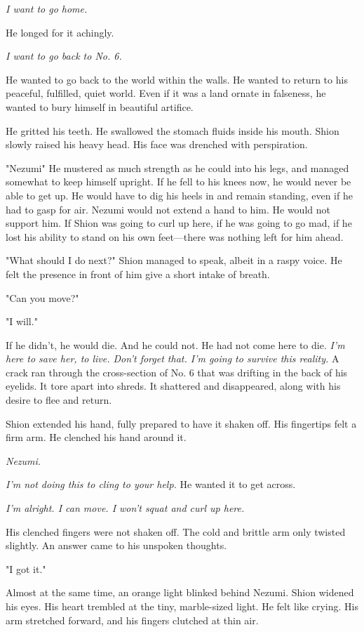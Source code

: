 \emph{I want to go home.}

He longed for it achingly.

\emph{I want to go back to No. 6.}

He wanted to go back to the world within the walls. He wanted to return
to his peaceful, fulfilled, quiet world. Even if it was a land ornate in
falseness, he wanted to bury himself in beautiful artifice.

He gritted his teeth. He swallowed the stomach fluids inside his mouth.
Shion slowly raised his heavy head. His face was drenched with
perspiration.

"Nezumi\el " He mustered as much strength as he could into his legs, and
managed somewhat to keep himself upright. If he fell to his knees now,
he would never be able to get up. He would have to dig his heels in and
remain standing, even if he had to gasp for air. Nezumi would not extend
a hand to him. He would not support him. If Shion was going to curl up
here, if he was going to go mad, if he lost his ability to stand on his
own feet---there was nothing left for him ahead.

"What should I do next?" Shion managed to speak, albeit in a raspy
voice. He felt the presence in front of him give a short intake of
breath.

"Can you move?"

"I will."

If he didn't, he would die. And he could not. He had not come here to
die. \emph{I'm here to save her, to live. Don't forget that. I'm going to
survive this reality.} A crack ran through the cross-section of No. 6
that was drifting in the back of his eyelids. It tore apart into shreds.
It shattered and disappeared, along with his desire to flee and return.

Shion extended his hand, fully prepared to have it shaken off. His
fingertips felt a firm arm. He clenched his hand around it.

\emph{Nezumi.}

\emph{I'm not doing this to cling to your help.} He wanted it to get across.

\emph{I'm alright. I can move. I won't squat and curl up here.}

His clenched fingers were not shaken off. The cold and brittle arm only
twisted slightly. An answer came to his unspoken thoughts.

"I got it."

Almost at the same time, an orange light blinked behind Nezumi. Shion
widened his eyes. His heart trembled at the tiny, marble-sized light. He
felt like crying. His arm stretched forward, and his fingers clutched at
thin air.

